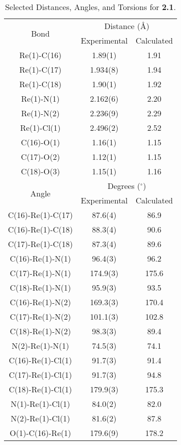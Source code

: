 \begin{table}[htbp]
  \caption{Selected Distances, Angles, and Torsions for \textbf{2.1}.}
  \centering
    \begin{tabular}{ccc}
    \toprule
    \multirow{2}{*}{Bond} & \multicolumn{2}{c}{Distance (\r{A})} \\ \cline{2-3}
     & Experimental & Calculated \\ \midrule
    Re(1)-C(16) & 1.89(1) & 1.91 \\
    Re(1)-C(17) & 1.934(8) & 1.94 \\
    Re(1)-C(18) & 1.90(1) & 1.92 \\
    Re(1)-N(1) & 2.162(6) & 2.20 \\
    Re(1)-N(2) & 2.236(9) & 2.29 \\
    Re(1)-Cl(1) & 2.496(2) & 2.52 \\ 
    C(16)-O(1) & 1.16(1) & 1.15 \\
    C(17)-O(2) & 1.12(1) & 1.15 \\
    C(18)-O(3) & 1.15(1) & 1.16 \\ \midrule
    \multirow{2}{*}{Angle} & \multicolumn{2}{c}{Degrees ($^\circ$)} \\ \cline{2-3}
     & Experimental & Calculated \\ \midrule
    C(16)-Re(1)-C(17) & 87.6(4) & 86.9 \\
    C(16)-Re(1)-C(18) & 88.3(4) & 90.6 \\
    C(17)-Re(1)-C(18) & 87.3(4) & 89.6 \\
    C(16)-Re(1)-N(1) & 96.4(3) & 96.2 \\
    C(17)-Re(1)-N(1) & 174.9(3) & 175.6 \\
    C(18)-Re(1)-N(1) & 95.9(3) & 93.5 \\
    C(16)-Re(1)-N(2) & 169.3(3) & 170.4 \\
    C(17)-Re(1)-N(2) & 101.1(3) & 102.8 \\
    C(18)-Re(1)-N(2) & 98.3(3) & 89.4 \\
    N(2)-Re(1)-N(1) & 74.5(3) & 74.1 \\
    C(16)-Re(1)-Cl(1) & 91.7(3) & 91.4 \\
    C(17)-Re(1)-Cl(1) & 91.7(3) & 94.8 \\
    C(18)-Re(1)-Cl(1) & 179.9(3) & 175.3 \\
    N(1)-Re(1)-Cl(1) & 84.0(2) & 82.0 \\
    N(2)-Re(1)-Cl(1) & 81.6(2) & 87.8 \\
    O(1)-C(16)-Re(1) & 179.6(9) & 178.2 \\

\end{tabular}
\end{table}
